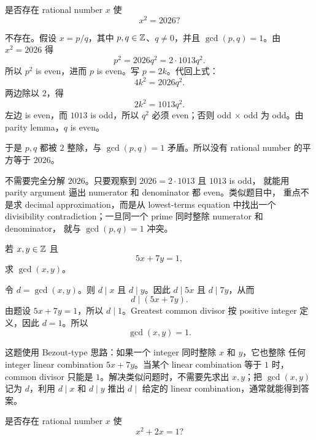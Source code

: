 \begin{exerciseblock}
是否存在 rational number \(x\) 使
\[
  x^2=2026?
\]
\end{exerciseblock}

\begin{solution}
不存在。假设 \(x=p/q\)，其中 \(p,q\in\mathbb{Z}\)、\(q\neq0\)，并且
\(\gcd(p,q)=1\)。由 \(x^2=2026\) 得
\[
  p^2=2026q^2=2\cdot1013q^2.
\]
所以 \(p^2\) is even，进而 \(p\) is even。写 \(p=2k\)。代回上式：
\[
  4k^2=2026q^2.
\]
两边除以 \(2\)，得
\[
  2k^2=1013q^2.
\]
左边 is even，而 \(1013\) is odd，所以 \(q^2\) 必须 even；否则 odd \(\times\)
odd 为 odd。由 parity lemma，\(q\) is even。

于是 \(p,q\) 都被 \(2\) 整除，与 \(\gcd(p,q)=1\) 矛盾。所以没有 rational
number 的平方等于 \(2026\)。
\end{solution}

\begin{explanation}
不需要完全分解 \(2026\)。只要观察到 \(2026=2\cdot1013\) 且 \(1013\) is odd，
就能用 parity argument 逼出 numerator 和 denominator 都 even。类似题目中，
重点不是求 decimal approximation，而是从 lowest-terms equation 中找出一个
divisibility contradiction；一旦同一个 prime 同时整除 numerator 和 denominator，
就与 \(\gcd(p,q)=1\) 冲突。
\end{explanation}

\begin{exerciseblock}
若 \(x,y\in\mathbb{Z}\) 且
\[
  5x+7y=1,
\]
求 \(\gcd(x,y)\)。
\end{exerciseblock}

\begin{solution}
令 \(d=\gcd(x,y)\)。则 \(d\mid x\) 且 \(d\mid y\)。因此 \(d\mid5x\) 且
\(d\mid7y\)，从而
\[
  d\mid(5x+7y).
\]
由题设 \(5x+7y=1\)，所以 \(d\mid1\)。Greatest common divisor 按 positive
integer 定义，因此 \(d=1\)。所以
\[
  \gcd(x,y)=1.
\]
\end{solution}

\begin{explanation}
这题使用 Bezout-type 思路：如果一个 integer 同时整除 \(x\) 和 \(y\)，它也整除
任何 integer linear combination \(5x+7y\)。当某个 linear combination 等于 \(1\)
时，common divisor 只能是 \(1\)。解决类似问题时，不需要先求出 \(x,y\)；把
\(\gcd(x,y)\) 记为 \(d\)，利用 \(d\mid x\) 和 \(d\mid y\) 推出 \(d\mid\) 给定的
linear combination，通常就能得到答案。
\end{explanation}

\begin{exerciseblock}
是否存在 rational number \(x\) 使
\[
  x^2+2x=1?
\]
\end{exerciseblock}

